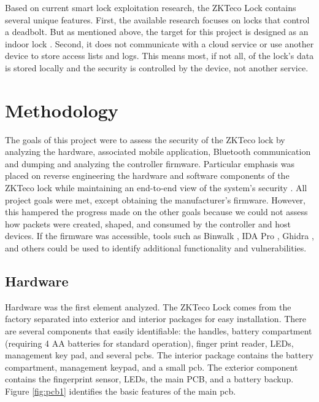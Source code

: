 \documentclass[conference]{IEEEtran}
\begin{document}
\bigskip

Based on current smart lock exploitation research, the ZKTeco Lock contains several unique features. First, the available research focuses on locks that control a deadbolt. But as mentioned above, the target for this project is designed as an indoor lock \cite{ZKTeco}. Second, it does not communicate with a cloud service or use another device to store access lists and logs. This means most, if not all, of the lock's data is stored locally and the security is controlled by the device, not another service.

\section{Methodology}

The goals of this project were to assess the security of the ZKTeco lock by analyzing the hardware, associated mobile application, Bluetooth communication and dumping and analyzing the controller firmware. Particular emphasis was placed on reverse engineering the hardware and software components of the ZKTeco lock while maintaining an end-to-end view of the system's security \cite{Ling2018}.  All project goals were met, except obtaining the manufacturer's firmware. However, this hampered the progress made on the other goals because we could not assess how packets were created, shaped, and consumed by the controller and host devices. If the firmware was accessible, tools such as Binwalk \cite{Heffner2019}, IDA Pro \cite{Hex-Rays2019}, Ghidra \cite{NationalSecurityAgency2019}, and others could be used to identify additional functionality and vulnerabilities. 


\subsection{Hardware}

Hardware was the first element analyzed. The ZKTeco Lock comes from the factory separated into exterior and interior packages for easy installation. There are several components that easily identifiable: the handles, battery compartment (requiring 4 AA batteries for standard operation), finger print reader, LEDs, management key pad, and several \gls{pcb}s. The interior package contains the battery compartment, management keypad, and a small \gls{pcb}.  The exterior component contains the fingerprint sensor, LEDs, the main PCB, and a battery backup.  Figure \ref{fig:pcb1} identifies the basic features of the main \gls{pcb}.
\end{document}
